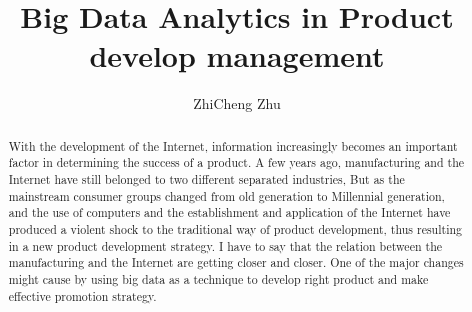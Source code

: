 \documentclass[sigconf]{acmart}
\begin{document}
\title{Big Data Analytics in Product develop management}


\author{ZhiCheng Zhu}


\begin{abstract}

    With the development of the Internet, information increasingly becomes an important factor in determining the success of a product. A few years ago, manufacturing and the Internet have still belonged to two different separated industries, But as the mainstream consumer groups changed from old generation to Millennial generation, and the use of computers and the establishment and application of the Internet have produced a violent shock to the traditional way of product development, thus resulting in a new product development strategy. I have to say that the relation between the manufacturing and the Internet are getting closer and closer. One of the major changes might cause by using big data as a technique to develop right product and make effective promotion strategy.
    
\end{abstract}


\maketitle
\end{document}
